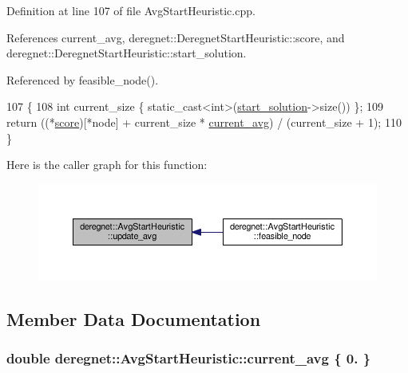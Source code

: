Definition at line 107 of file Avg\+Start\+Heuristic.\+cpp.



References current\+\_\+avg, deregnet\+::\+Deregnet\+Start\+Heuristic\+::score, and deregnet\+::\+Deregnet\+Start\+Heuristic\+::start\+\_\+solution.



Referenced by feasible\+\_\+node().


\begin{DoxyCode}
107                                                \{
108     \textcolor{keywordtype}{int} current\_size \{ \textcolor{keyword}{static\_cast<}\textcolor{keywordtype}{int}\textcolor{keyword}{>}(\hyperlink{classderegnet_1_1DeregnetStartHeuristic_a7450e11ca0a265b055f95e7832b65e2f}{start\_solution}->size()) \};
109     \textcolor{keywordflow}{return} ((*\hyperlink{classderegnet_1_1DeregnetStartHeuristic_ae03300e79482975e98f95cba19ad32b0}{score})[*node] + current\_size * \hyperlink{classderegnet_1_1AvgStartHeuristic_a2c4b3fa6aa7946276404e650ea42fd14}{current\_avg}) / (current\_size + 1);
110 \}
\end{DoxyCode}


Here is the caller graph for this function\+:\nopagebreak
\begin{figure}[H]
\begin{center}
\leavevmode
\includegraphics[width=350pt]{classderegnet_1_1AvgStartHeuristic_ab3cbc873952af7525654194a7d5e59e0_icgraph}
\end{center}
\end{figure}




\subsection{Member Data Documentation}
\subsubsection[{\texorpdfstring{current\+\_\+avg}{current_avg}}]{\setlength{\rightskip}{0pt plus 5cm}double deregnet\+::\+Avg\+Start\+Heuristic\+::current\+\_\+avg \{ 0. \}\hspace{0.3cm}{\ttfamily [private]}}\hypertarget{classderegnet_1_1AvgStartHeuristic_a2c4b3fa6aa7946276404e650ea42fd14}{}\label{classderegnet_1_1AvgStartHeuristic_a2c4b3fa6aa7946276404e650ea42fd14}


